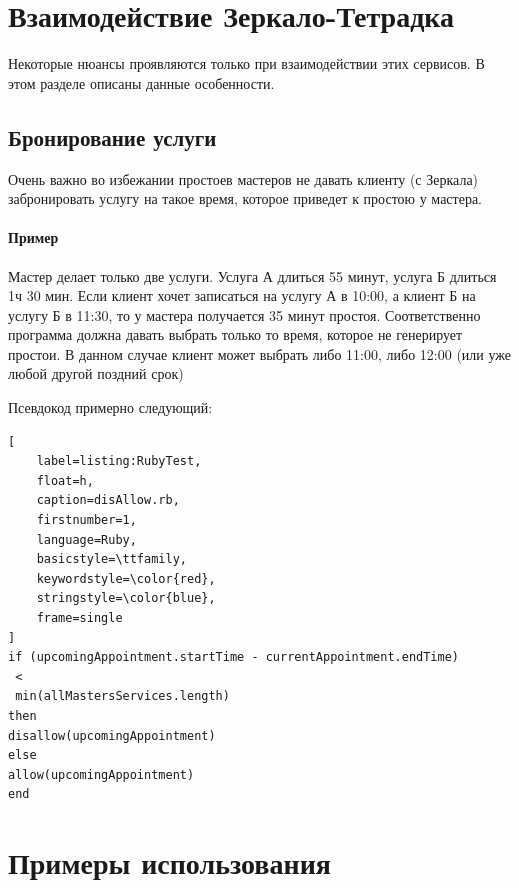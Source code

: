 \documentclass[DIV=calc, paper=a4, fontsize=11pt]{scrartcl} %
\begin{document}
\section{Взаимодействие Зеркало-Тетрадка}

Некоторые нюансы проявляются только при взаимодействии этих сервисов. В этом разделе описаны данные особенности.

\subsection{Бронирование услуги}

Очень важно во избежании простоев мастеров не давать клиенту (с Зеркала) забронировать услугу на такое время, которое приведет к простою у мастера. 

\begin{framed}
	\paragraph{Пример} Мастер делает только две услуги. Услуга А длиться 55 минут, услуга Б длиться 1ч 30 мин. Если клиент хочет записаться на услугу А в 10:00, а клиент Б на услугу Б в 11:30, то у мастера получается 35 минут простоя. Соответственно программа должна давать выбрать только то время, которое не генерирует простои. В данном случае клиент может выбрать либо 11:00, либо 12:00 (или уже любой другой поздний срок)	
\end{framed}

Псевдокод примерно следующий:	

\begin{lstlisting}[
    label=listing:RubyTest,
    float=h,
    caption=disAllow.rb,
    firstnumber=1,
    language=Ruby,
    basicstyle=\ttfamily,
    keywordstyle=\color{red},
    stringstyle=\color{blue},
    frame=single
]
if (upcomingAppointment.startTime - currentAppointment.endTime)
 < 
 min(allMastersServices.length)
then
disallow(upcomingAppointment)
else
allow(upcomingAppointment)
end
\end{lstlisting}



\section{Примеры использования}
\end{document}
